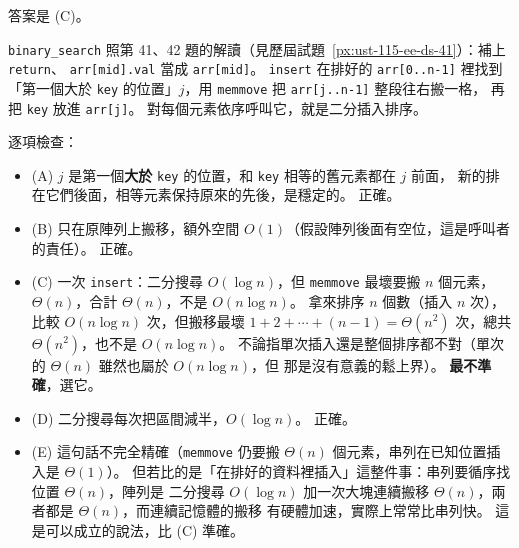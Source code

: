 \begin{pastsoln}
答案是 (C)。

\texttt{binary\_search} 照第 41、42 題的解讀（見歷屆試題~\ref{px:ust-115-ee-ds-41}）：補上 \texttt{return}、
\texttt{arr[mid].val} 當成 \texttt{arr[mid]}。 \texttt{insert} 在排好的 \texttt{arr[0..n-1]} 裡找到
「第一個大於 \texttt{key} 的位置」$j$，用 \texttt{memmove} 把 \texttt{arr[j..n-1]} 整段往右搬一格，
再把 \texttt{key} 放進 \texttt{arr[j]}。 對每個元素依序呼叫它，就是二分插入排序。

逐項檢查：
\begin{itemize}
\item (A) $j$ 是第一個\textbf{大於} \texttt{key} 的位置，和 \texttt{key} 相等的舊元素都在 $j$ 前面，
新的排在它們後面，相等元素保持原來的先後，是穩定的。 正確。
\item (B) 只在原陣列上搬移，額外空間 $O(1)$（假設陣列後面有空位，這是呼叫者的責任）。 正確。
\item (C) 一次 \texttt{insert}：二分搜尋 $O(\log n)$，但 \texttt{memmove} 最壞要搬 $n$ 個元素，
$\Theta(n)$，合計 $\Theta(n)$，不是 $O(n \log n)$。 拿來排序 $n$ 個數（插入 $n$ 次），比較
$O(n \log n)$ 次，但搬移最壞 $1 + 2 + \cdots + (n-1) = \Theta(n^2)$ 次，總共 $\Theta(n^2)$，也不是
$O(n \log n)$。 不論指單次插入還是整個排序都不對（單次的 $\Theta(n)$ 雖然也屬於 $O(n \log n)$，但
那是沒有意義的鬆上界）。 \textbf{最不準確}，選它。
\item (D) 二分搜尋每次把區間減半，$O(\log n)$。 正確。
\item (E) 這句話不完全精確（\texttt{memmove} 仍要搬 $\Theta(n)$ 個元素，串列在已知位置插入是
$\Theta(1)$）。 但若比的是「在排好的資料裡插入」這整件事：串列要循序找位置 $\Theta(n)$，陣列是
二分搜尋 $O(\log n)$ 加一次大塊連續搬移 $\Theta(n)$，兩者都是 $\Theta(n)$，而連續記憶體的搬移
有硬體加速，實際上常常比串列快。 這是可以成立的說法，比 (C) 準確。
\end{itemize}
\end{pastsoln}
